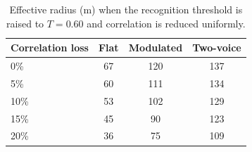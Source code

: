 \begin{table}[H]
\centering
\caption{Effective radius (m) when the recognition threshold is raised to $T=0.60$ and correlation is reduced uniformly.}
\label{tab:p4noise}
\small
\begin{tabular}{lccc}
\toprule
Correlation loss & Flat & Modulated & Two-voice \\
\midrule
0\% & 67 & 120 & 137 \\
5\% & 60 & 111 & 134 \\
10\% & 53 & 102 & 129 \\
15\% & 45 & 90 & 123 \\
20\% & 36 & 75 & 109 \\
\bottomrule
\end{tabular}
\end{table}